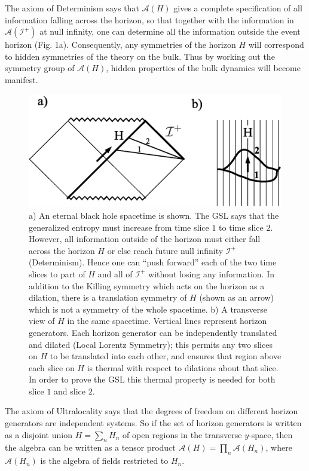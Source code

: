 \documentclass{article}
\begin{document}
The axiom of Determinism says that $\mathcal{A}(H)$ gives a complete specification of all information falling across the horizon, so that together with the information in $\mathcal{A}(\mathcal{I}^+)$ at null infinity, one can determine all the information outside the event horizon (Fig. 1a).  Consequently, any symmetries of the horizon $H$ will correspond to hidden symmetries of the theory on the bulk.  Thus by working out the symmetry group of $\mathcal{A}(H)$, hidden properties of the bulk dynamics will become manifest.

\begin{figure}[ht]
\centering
\includegraphics[width=.85\textwidth]{nullslice.eps}
\caption{\footnotesize a) An eternal black hole spacetime is shown.  The GSL says that the generalized entropy must increase from time slice $1$ to time slice $2$.  However, all information outside of the horizon must either fall across the horizon $H$ or else reach future null infinity $\mathcal{I}^+$ (Determinism).  Hence one can ``push forward'' each of the two time slices to part of $H$ and all of $\mathcal{I}^+$ without losing any information.  In addition to the Killing symmetry which acts on the horizon as a dilation, there is a translation symmetry of $H$ (shown as an arrow) which is not a symmetry of the whole spacetime.
b) A transverse view of $H$ in the same spacetime.  Vertical lines represent horizon generators.  Each horizon generator can be independently translated and dilated (Local Lorentz Symmetry); this permits any two slices on $H$ to be translated into each other, and ensures that region above each slice on $H$ is thermal with respect to dilations about that slice.  In order to prove the GSL this thermal property is needed for both slice $1$ and slice $2$.
} \label{nullslice}
\end{figure}

The axiom of Ultralocality says that the degrees of freedom on different horizon generators are independent systems.  So if the set of horizon generators is written as a disjoint union $H = \sum_n H_n$ of open regions in the transverse $y$-space, then the algebra can be written as a tensor product $\mathcal{A}(H) = \prod_n \mathcal{A}(H_n)$, where $\mathcal{A}(H_n)$ is the algebra of fields restricted to $H_n$.
\end{document}
